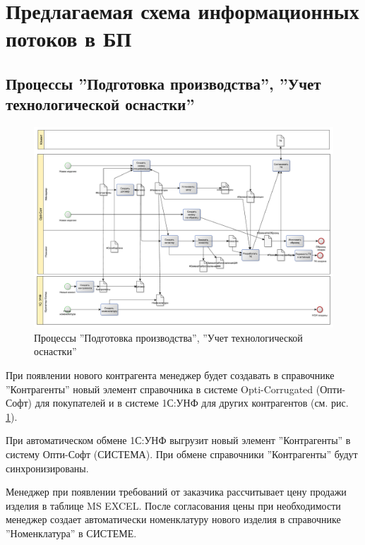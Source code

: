 



%
\newpage
\section{Предлагаемая схема информационных потоков в БП}

\subsection{Процессы ''Подготовка производства'', ''Учет технологической оснастки''}
\begin{figure}
\begin{center}
  \includegraphics[angle=90, height=0.9\textheight, keepaspectratio]{Pics/1_NewGoods.pdf}
\end{center}
  \caption{Процессы ''Подготовка производства'', ''Учет технологической оснастки''}
  \label{pic:Schema_1}
\end{figure}
\clearpage

При появлении нового контрагента менеджер будет создавать в справочнике ''Контрагенты'' новый элемент справочника в системе Opti-Corrugated (Опти-Софт) для покупателей и в системе 1С:УНФ для других контрагентов (см. рис. \ref{pic:Schema_1}).


При автоматическом обмене 1С:УНФ выгрузит новый элемент ''Контрагенты'' в систему  Опти-Софт (СИСТЕМА). При обмене справочники ''Контрагенты'' будут синхронизированы. 

Менеджер при появлении требований от заказчика рассчитывает цену продажи изделия в таблице MS EXCEL. После согласования цены при необходимости менеджер создает автоматически номенклатуру нового изделия в справочнике ''Номенклатура'' в СИСТЕМЕ. 

